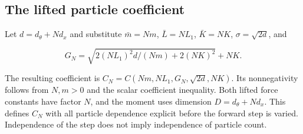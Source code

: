 \documentclass[11pt,a4paper]{report}
\begin{document}
\subsection{\texorpdfstring{The lifted particle coefficient}{The lifted particle coefficient}}
\label{report-step-ProximalLangevin-SplittingEndpoint-lean-3}


Let \(d=d_\theta+Nd_x\) and substitute \(\bar m=Nm\), \(\bar L=NL_1\), \(\bar K=NK\), \(\sigma=\sqrt{2d}\), and

\[G_N=\sqrt{2(NL_1)^2d/(Nm)+2(NK)^2}+NK.\]

The resulting coefficient is \(C_N=C(Nm,NL_1,G_N,\sqrt{2d},NK)\). Its nonnegativity follows from \(N,m>0\) and the scalar coefficient inequality. Both lifted force constants have factor \(N\), and the moment uses dimension \(D=d_\theta+Nd_x\). This defines \(C_N\) with all particle dependence explicit before the forward step is varied. Independence of the step does not imply independence of particle count.
\end{document}
